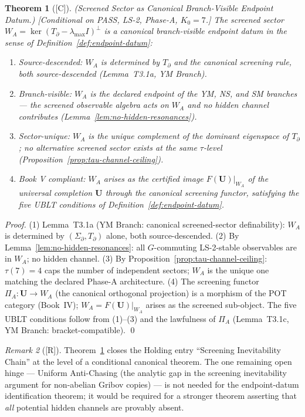 \documentclass[12pt,oneside]{amsbook}
\theoremstyle{plain}
\newtheorem{theorem}{Theorem}[section]
\theoremstyle{definition}
\theoremstyle{remark}
\newtheorem{remark}[theorem]{Remark}
\newcommand{\status}[1]{\textup{[#1]}}
\begin{document}
\begin{theorem}[\status{C}]\label{thm:screened-sector-endpoint}
\textup{(Screened Sector as Canonical Branch-Visible Endpoint Datum.)}
\textup{[Conditional on PASS, LS-2, Phase-A, $K_0=7$.]}
The screened sector $W_A = \ker(T_\partial - \lambda_{\max}I)^\perp$
is a canonical branch-visible endpoint datum in the sense of
Definition~\ref{def:endpoint-datum}:
\begin{enumerate}[label=\textup{(\arabic*)}]
  \item \emph{Source-descended}: $W_A$ is determined by
    $T_\partial$ and the canonical screening rule, both
    source-descended (Lemma~T3.1a, YM Branch).
  \item \emph{Branch-visible}: $W_A$ is the declared endpoint
    of the YM, NS, and SM branches --- the screened observable
    algebra acts on $W_A$ and no hidden channel contributes
    (Lemma~\ref{lem:no-hidden-resonances}).
  \item \emph{Sector-unique}: $W_A$ is the unique complement
    of the dominant eigenspace of $T_\partial$; no alternative
    screened sector exists at the same $\tau$-level
    (Proposition~\ref{prop:tau-channel-ceiling}).
  \item \emph{Book V compliant}: $W_A$ arises as the certified
    image $F(\mathbf{U})|_{W_A}$ of the universal completion
    $\mathbf{U}$ through the canonical screening functor,
    satisfying the five UBLT conditions of
    Definition~\ref{def:endpoint-datum}.
\end{enumerate}
\end{theorem}

\begin{proof}
(1) Lemma~T3.1a (YM Branch: canonical screened-sector definability):
$W_A$ is determined by $(\Sigma_\partial, T_\partial)$ alone,
both source-descended.
(2) By Lemma~\ref{lem:no-hidden-resonances}: all $G$-commuting
LS-2-stable observables are in $W_A$; no hidden channel.
(3) By Proposition~\ref{prop:tau-channel-ceiling}: $\tau(7)=4$
caps the number of independent sectors; $W_A$ is the unique
one matching the declared Phase-A architecture.
(4) The screening functor $\Pi_A : \mathbf{U} \to W_A$
(the canonical orthogonal projection) is a morphism of
the POT category (Book~IV); $W_A = F(\mathbf{U})|_{W_A}$
arises as the screened sub-object.  The five UBLT conditions
follow from (1)--(3) and the lawfulness of $\Pi_A$
(Lemma~T3.1c, YM Branch: bracket-compatible). \qed
\end{proof}

\begin{remark}[\status{R}]
Theorem~\ref{thm:screened-sector-endpoint} closes the Holding
entry ``Screening Inevitability Chain'' at the level of a
conditional canonical theorem.  The one remaining open hinge
--- Uniform Anti-Chasing (the analytic gap in the screening
inevitability argument for non-abelian Gribov copies) ---
is not needed for the endpoint-datum identification theorem;
it would be required for a stronger theorem asserting that
\emph{all} potential hidden channels are provably absent.
\end{remark}
\end{document}
